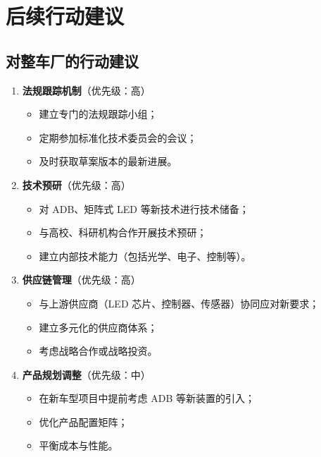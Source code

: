 \section{后续行动建议}

\subsection{对整车厂的行动建议}

\begin{enumerate}[leftmargin=2em]
    \item \textbf{法规跟踪机制}（优先级：高）
    \begin{itemize}[leftmargin=2em]
        \item 建立专门的法规跟踪小组；
        \item 定期参加标准化技术委员会的会议；
        \item 及时获取草案版本的最新进展。
    \end{itemize}

    \item \textbf{技术预研}（优先级：高）
    \begin{itemize}[leftmargin=2em]
        \item 对 ADB、矩阵式 LED 等新技术进行技术储备；
        \item 与高校、科研机构合作开展技术预研；
        \item 建立内部技术能力（包括光学、电子、控制等）。
    \end{itemize}

    \item \textbf{供应链管理}（优先级：高）
    \begin{itemize}[leftmargin=2em]
        \item 与上游供应商（LED 芯片、控制器、传感器）协同应对新要求；
        \item 建立多元化的供应商体系；
        \item 考虑战略合作或战略投资。
    \end{itemize}

    \item \textbf{产品规划调整}（优先级：中）
    \begin{itemize}[leftmargin=2em]
        \item 在新车型项目中提前考虑 ADB 等新装置的引入；
        \item 优化产品配置矩阵；
        \item 平衡成本与性能。
    \end{itemize}


\end{enumerate}
